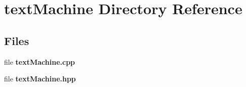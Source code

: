 \section{text\+Machine Directory Reference}
\label{dir_d9f3765c9e79e39b633d8f465ec13cbf}
\subsection*{Files}
\begin{DoxyCompactItemize}
\item 
file \textbf{ text\+Machine.\+cpp}
\item 
file \textbf{ text\+Machine.\+hpp}
\end{DoxyCompactItemize}
